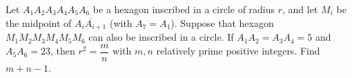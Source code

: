Let $A_1A_2A_3A_4A_5A_6$ be a hexagon inscribed in a circle of radius $r$, and let $M_i$ be the midpoint of $\overline{A_iA_{i+1}}$ (with $A_7=A_1$). Suppose that hexagon $M_1M_2M_3M_4M_5M_6$ can also be inscribed in a circle. If $A_1A_2=A_3A_4=5$ and $A_5A_6=23$, then $r^2=\dfrac mn$ with $m,n$ relatively prime positive integers. Find $m+n-1$.
